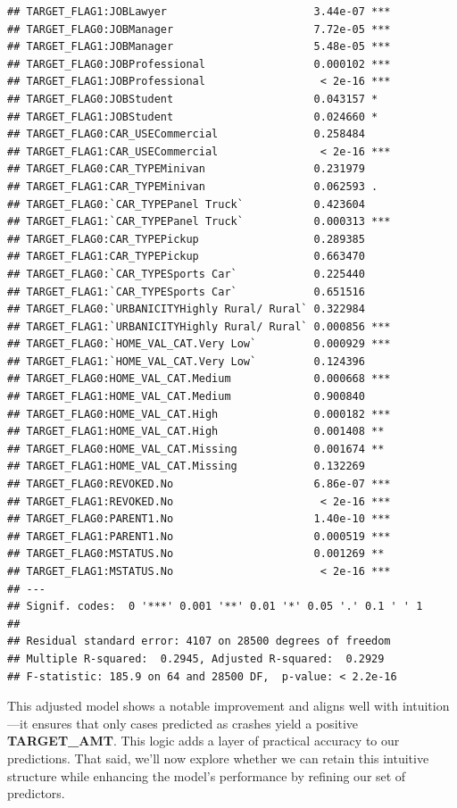 \documentclass[
]{article}
\begin{document}
\begin{verbatim}
## TARGET_FLAG1:JOBLawyer                       3.44e-07 ***
## TARGET_FLAG0:JOBManager                      7.72e-05 ***
## TARGET_FLAG1:JOBManager                      5.48e-05 ***
## TARGET_FLAG0:JOBProfessional                 0.000102 ***
## TARGET_FLAG1:JOBProfessional                  < 2e-16 ***
## TARGET_FLAG0:JOBStudent                      0.043157 *  
## TARGET_FLAG1:JOBStudent                      0.024660 *  
## TARGET_FLAG0:CAR_USECommercial               0.258484    
## TARGET_FLAG1:CAR_USECommercial                < 2e-16 ***
## TARGET_FLAG0:CAR_TYPEMinivan                 0.231979    
## TARGET_FLAG1:CAR_TYPEMinivan                 0.062593 .  
## TARGET_FLAG0:`CAR_TYPEPanel Truck`           0.423604    
## TARGET_FLAG1:`CAR_TYPEPanel Truck`           0.000313 ***
## TARGET_FLAG0:CAR_TYPEPickup                  0.289385    
## TARGET_FLAG1:CAR_TYPEPickup                  0.663470    
## TARGET_FLAG0:`CAR_TYPESports Car`            0.225440    
## TARGET_FLAG1:`CAR_TYPESports Car`            0.651516    
## TARGET_FLAG0:`URBANICITYHighly Rural/ Rural` 0.322984    
## TARGET_FLAG1:`URBANICITYHighly Rural/ Rural` 0.000856 ***
## TARGET_FLAG0:`HOME_VAL_CAT.Very Low`         0.000929 ***
## TARGET_FLAG1:`HOME_VAL_CAT.Very Low`         0.124396    
## TARGET_FLAG0:HOME_VAL_CAT.Medium             0.000668 ***
## TARGET_FLAG1:HOME_VAL_CAT.Medium             0.900840    
## TARGET_FLAG0:HOME_VAL_CAT.High               0.000182 ***
## TARGET_FLAG1:HOME_VAL_CAT.High               0.001408 ** 
## TARGET_FLAG0:HOME_VAL_CAT.Missing            0.001674 ** 
## TARGET_FLAG1:HOME_VAL_CAT.Missing            0.132269    
## TARGET_FLAG0:REVOKED.No                      6.86e-07 ***
## TARGET_FLAG1:REVOKED.No                       < 2e-16 ***
## TARGET_FLAG0:PARENT1.No                      1.40e-10 ***
## TARGET_FLAG1:PARENT1.No                      0.000519 ***
## TARGET_FLAG0:MSTATUS.No                      0.001269 ** 
## TARGET_FLAG1:MSTATUS.No                       < 2e-16 ***
## ---
## Signif. codes:  0 '***' 0.001 '**' 0.01 '*' 0.05 '.' 0.1 ' ' 1
## 
## Residual standard error: 4107 on 28500 degrees of freedom
## Multiple R-squared:  0.2945, Adjusted R-squared:  0.2929 
## F-statistic: 185.9 on 64 and 28500 DF,  p-value: < 2.2e-16
\end{verbatim}

This adjusted model shows a notable improvement and aligns well with
intuition---it ensures that only cases predicted as crashes yield a
positive \textbf{TARGET\_AMT}. This logic adds a layer of practical
accuracy to our predictions. That said, we'll now explore whether we can
retain this intuitive structure while enhancing the model's performance
by refining our set of predictors.
\end{document}
